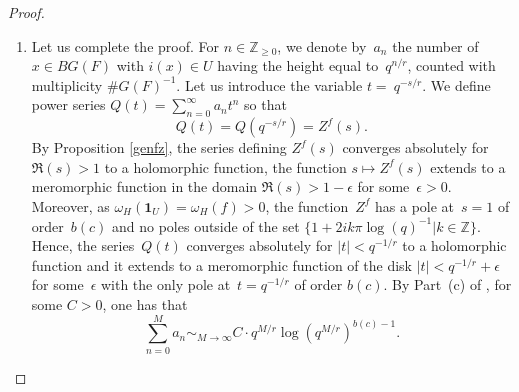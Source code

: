 \documentclass[a4paper,english,12pt]{amsart}
\newcommand{\ZZ}{\mathbb{Z}}
\newcommand{\vMFz}{v\in M_F ^0}
\newcommand{\wH}{\widehat H}
\numberwithin{equation}{subsection}
\begin{document}
\begin{proof}
\begin{enumerate}
\item Let us complete the proof. For $n\in\ZZ_{\geq 0}$, we denote by~$a_n$ the number of $x\in BG(F)$ with $i(x)\in U$ having the height equal to~$q^{n/r}$, counted with multiplicity $\# G(F)^{-1}$. Let us introduce the variable $t=~q^{-s/r}$. We define power series $Q(t)=\sum _{n=0}^{\infty}a_nt^{n}$ so that $$Q(t)=Q(q^{-s/r})=Z^f(s).$$
By Proposition \ref{genfz}, the series defining $Z^f(s)$ converges absolutely for $\Re(s)> 1$ to a holomorphic function, the function $s\mapsto Z^f(s)$ extends to a meromorphic function in the domain $\Re(s)>1-\epsilon$ for some~$\epsilon>0.$ Moreover, as $\omega_H(\mathbf 1_U)=\omega_H(f)>0$, the function~$Z^f$ has a pole at~$s=1$ of order~$b(c)$ and no poles outside of the set $\{1+2ik\pi\log(q)^{-1}|k\in\ZZ\}$. %
Hence, the series~$Q(t)$ converges absolutely for $|t|<q^{-1/r}$ to a holomorphic function and it extends to a meromorphic function of the disk $|t|<q^{-1/r}+\epsilon$ for some~$\epsilon$ with the only pole at~$t=q^{-1/r}$ of order $b(c)$. By Part~(c) of \cite[Theorem A.5]{lagemanartinschreier}, for some $C>0$, one has that $$\sum_{n=0}^Ma_n\sim_{M\to\infty} C\cdot q^{M/r}\log(q^{M/r})^{b(c)-1}.$$

\end{enumerate}
\end{proof}
\end{document}
